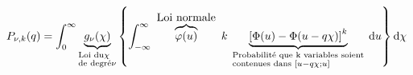 \begin{equation}
   P _{\nu , k} (q) = \int _{0}^{\infty} \underbrace{g _{\nu} (\chi )}_{\begin{subarray}{ l }\text{Loi du} \chi \\ \text {de degré} \nu \end{subarray}} \left\{\int_{-\infty}^{\infty} \overbrace{\varphi ( u )}^{\mbox{ Loi normale }} k \underbrace{\left [ \Phi (u ) -\Phi ( u - q \chi ) \right ]^{ k } }_{\begin{subarray}{ l }\text{ Probabilité que k variables soient } \\ \text{ contenues dans }[ u - q \chi ; u ] \end{subarray}} \mathrm{ d} u \right\} \mathrm{ d } \chi
\end{equation}
